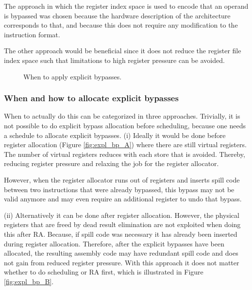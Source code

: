 The approach in which the register index space is used to encode that an operand is bypassed was chosen because the hardware description of the architecture corresponds to that, and because this does not require any modification to the instruction format.

The other approach would be beneficial since it does not reduce the register file index space such that limitations to high register pressure can be avoided.

\begin{figure}[b!]
\centering
{}
\vspace{10px}
\caption{When to apply explicit bypasses.}
\label{fig:expl_bp}
\end{figure}

\subsubsection{When and how to allocate explicit bypasses}
When to actually do this can be categorized in three approaches. Trivially, it is not possible to do explicit bypass allocation before scheduling, because one needs a schedule to allocate explicit bypasses. %
(i) Ideally it would be done before register allocation (Figure \ref{fig:expl_bp_A}) where there are still virtual registers. The number of virtual registers reduces with each store that is avoided. Thereby, reducing register pressure and relaxing the job for the register allocator.

However, when the register allocator runs out of registers and inserts spill code between two instructions that were already bypassed, this bypass may not be valid anymore and may even require an additional register to undo that bypass.

(ii) Alternatively it can be done after register allocation. However, the physical registers that are freed by dead result elimination are not exploited when doing this after RA. Because, if spill code was necessary it has already been inserted during register allocation. Therefore, after the explicit bypasses have been allocated, the resulting assembly code may have redundant spill code and does not gain from reduced register pressure. With this approach it does not matter whether to do scheduling or RA first, which is illustrated in Figure \ref{fig:expl_bp_B}.

